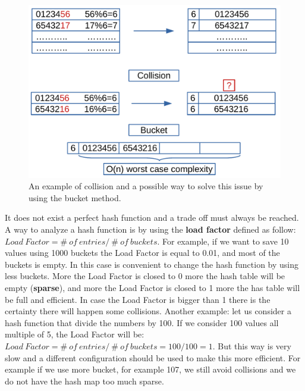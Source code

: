 \begin{figure}[H]
	\begin{center}
		\includegraphics[scale=.6]{chapters/datastructures/images/map_2.pdf}
		\caption[An example of collision and a possible way to solve this issue by using the bucket method.]{An example of collision and a possible way to solve this issue by using the bucket method.}
		\label{map_2}
	\end{center}
\end{figure}

It does not exist a perfect hash function and a trade off must always be reached. A way to analyze a hash function is by using the \textbf{load factor} defined as follow: \(Load \ Factor = \# \ of \ entries / \ \# \ of \ buckets\). For example, if we want to save 10 values using 1000 buckets the Load Factor is equal to 0.01, and most of the buckets is empty. In this case is convenient to change the hash function by using less buckets. More the Load Factor is closed to 0 more the hash table will be empty (\textbf{sparse}), and more the Load Factor is closed to 1 more the has table will be full and efficient. In case the Load Factor is bigger than 1 there is the certainty there will happen some collisions.
Another example: let us consider a hash function that divide the numbers by 100. If we consider 100 values all multiple of 5, the Load Factor will be: \(Load \ Factor = \# \ of \ entries / \ \# \ of \ buckets = 100/100 = 1\). But this way is very slow and a different configuration should be used to make this more efficient. For example if we use more bucket, for example 107, we still avoid collisions and we do not have the hash map too much sparse.

